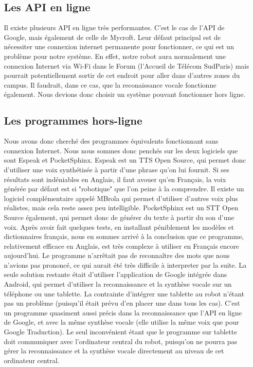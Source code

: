 \documentclass[a4paper,10pt]{report}
\begin{document}
      \subsection{Les API en ligne}
      {Il existe plusieurs API en ligne très performantes. C'est le cas de l'API de Google, mais également de celle de Mycroft. Leur défaut principal est
          de nécessiter une connexion internet permanente pour fonctionner, ce qui est un problème pour notre système. En effet, notre robot aura normalement
          une connexion Internet via Wi-Fi dans le Forum (l'Accueil de Télécom SudParis) mais pourrait potentiellement sortir de cet endroit pour aller dans
          d'autres zones du campus. Il faudrait, dans ce cas, que la reconaissance vocale fonctionne également. Nous devions donc choisir un système pouvant
          fonctionner hors ligne.}
      \subsection{Les programmes hors-ligne}
      {Nous avons donc cherché des programmes équivalents fonctionnant sans connexion Internet. Nous nous sommes donc penchés sur les deux logiciels que
          sont Espeak et PocketSphinx.}
      {Espeak est un TTS Open Source, qui permet donc d'utiliser une voix synthétisée à partir d'une phrase qu'on lui fournit. Si ses résultats sont
          indéniables en Anglais, il faut avouer qu'en Français, la voix générée par défaut est si "robotique" que l'on peine à la comprendre. Il existe un
          logiciel complémentaire appelé MBrola qui permet d'utiliser d'autres voix plus réalistes, mais cela reste assez peu intelligible.}
      {PocketSphinx est un STT Open Source également, qui permet donc de générer du texte à partir du son d'une voix. Après avoir fait quelques tests,
          en installant péniblement les modèles et dictionnaires français, nous en sommes arrivé à la conclusion que ce programme, relativement efficace en Anglais,
          est très complexe à utiliser en Français encore aujourd'hui. Le programme n'arrêtait pas de reconnaître des mots que nous n'avions pas prononcé, ce qui
          aurait été très difficile à interpreter par la suite.}
      {La seule solution restante était d'utiliser l'application de Google intégrée dans Android, qui permet d'utiliser la reconnaissance et la synthèse vocale
          sur un téléphone ou une tablette. La contrainte d'intégrer une tablette au robot n'étant pas un problème (puisqu'il était prévu d'en placer une dans tous les cas).
          C'est un programme quasiment aussi précis dans la reconnaissance que l'API en ligne de Google, et avec la même synthèse vocale (elle utilise la même voix que pour
          Google Traduction). Le seul inconvénient étant que le programme sur tablette doit communiquer avec l'ordinateur central du robot, puisqu'on ne pourra pas gérer la reconnaissance et la synthèse vocale directement au niveau de cet ordinateur central.}
\end{document}
